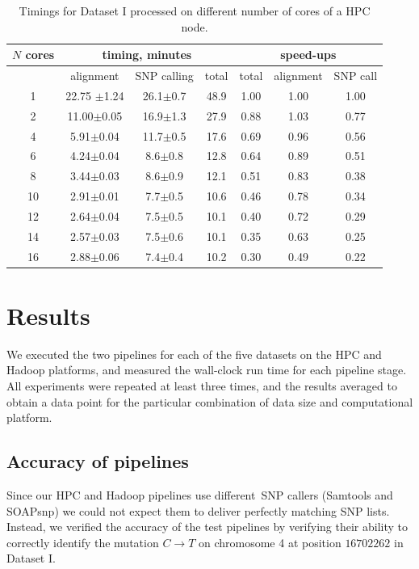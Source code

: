 \documentclass{bioinfo}
\begin{document}
\begin{table}[!ht]
\small
\caption{Timings for Dataset I processed on different number of cores of a HPC node.}
\begin{center}
\begin{tabular}{c|c|c|c|ccc}
$N$ cores	&\multicolumn{3}{c|}{timing, minutes}&\multicolumn{3}{c}{speed-ups} \\
\hline
	& alignment 	&	SNP calling	&	total  &total & alignment& SNP call\\
\hline
1	&	22.75	$\pm$1.24&	26.1$\pm$0.7	&	48.9	&	 1.00	&	1.00	&	1.00\\
2	&	11.00$\pm$0.05	&	16.9$\pm$1.3	&	27.9	&	 0.88	&	1.03	&	0.77\\
4	&	5.91$\pm$0.04	&	11.7$\pm$0.5	&	17.6	&	 0.69	&	0.96	&	0.56\\
6	&	4.24$\pm$0.04	&	8.6$\pm$0.8	&	12.8	&	 0.64	&	0.89	&	0.51\\
8	&	3.44$\pm$0.03	&	8.6$\pm$0.9	&	12.1	&	 0.51	&	0.83	&	0.38\\
10	&	2.91$\pm$0.01	&	7.7$\pm$0.5	&	10.6	&	 0.46	&	0.78	&	0.34\\
12	&	2.64$\pm$0.04	&	7.5$\pm$0.5	&	10.1	&	 0.40	&	0.72	&	0.29\\
14	&	2.57$\pm$0.03	&	7.5$\pm$0.6	&	10.1	&	 0.35	&	0.63	&	0.25\\
16	&	2.88$\pm$0.06	&	7.4$\pm$0.4	&	10.2	&	 0.30	&	0.49	&	0.22\\
\end{tabular}
\end{center}
\label{table:timings-hpc}
\normalsize
\end{table}



\section{Results}
We executed the two pipelines for each of the five 
datasets on the HPC and Hadoop platforms, and measured the wall-clock run time for each pipeline stage.  
All experiments were repeated at least three times, 
and the results averaged to obtain a data point for the
particular combination of data size and computational platform.

\subsection*{Accuracy of pipelines}
Since our HPC and Hadoop pipelines use different~SNP callers (Samtools and
SOAPsnp) we could not expect them to deliver perfectly
matching SNP lists. Instead, we verified the accuracy of the test pipelines by
verifying their ability to correctly identify the mutation $C\rightarrow T$ on
chromosome 4 at position $16702262$ \citep{schneeberger} in Dataset I.
\end{document}
